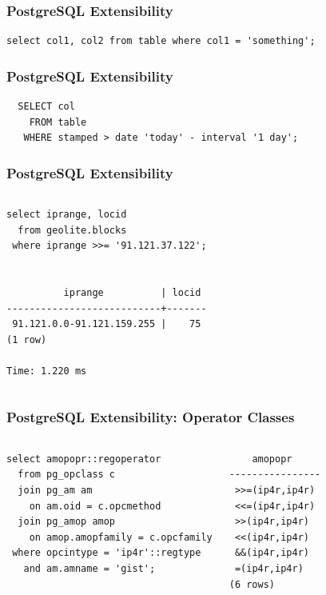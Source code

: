 \documentclass{beamer}
\begin{document}
\begin{frame}[fragile]
  \frametitle{PostgreSQL Extensibility}

\begin{verbatim}
select col1, col2 from table where col1 = 'something';
\end{verbatim}
\end{frame}

\begin{frame}[fragile]
  \frametitle{PostgreSQL Extensibility}

\begin{verbatim}
  SELECT col
    FROM table
   WHERE stamped > date 'today' - interval '1 day';
\end{verbatim}
\end{frame}

\begin{frame}[fragile]
  \frametitle{PostgreSQL Extensibility}

\begin{columns}
\begin{verbatim}
select iprange, locid
  from geolite.blocks
 where iprange >>= '91.121.37.122';


          iprange          | locid 
---------------------------+-------
 91.121.0.0-91.121.159.255 |    75
(1 row)

Time: 1.220 ms
\end{verbatim}
\end{columns}
\end{frame}

\begin{frame}[fragile]
  \frametitle{PostgreSQL Extensibility: Operator Classes}

  \vfill

\begin{columns}
\begin{verbatim}
select amopopr::regoperator
  from pg_opclass c
  join pg_am am
    on am.oid = c.opcmethod
  join pg_amop amop
    on amop.amopfamily = c.opcfamily
 where opcintype = 'ip4r'::regtype
   and am.amname = 'gist';
\end{verbatim}  
\begin{verbatim}
    amopopr     
----------------
 >>=(ip4r,ip4r)
 <<=(ip4r,ip4r)
 >>(ip4r,ip4r)
 <<(ip4r,ip4r)
 &&(ip4r,ip4r)
 =(ip4r,ip4r)
(6 rows)
\end{verbatim}
\end{columns}
\end{frame}
\end{document}
